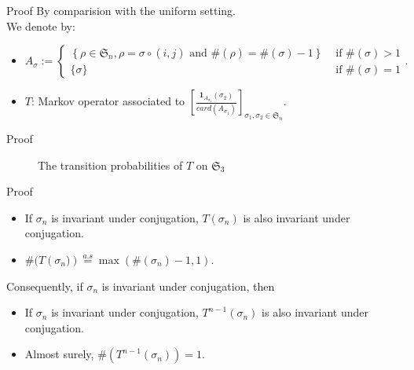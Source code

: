 \documentclass[english,xcolor=table]{beamer}
\begin{document}
\begin{frame}{Proof} 
By comparision with the uniform setting. 
\\ 
We denote by:
\begin{itemize}
    \item $A_\sigma:=
    \begin{cases}
        \left\{\rho\in\mathfrak{S}_n,\rho =\sigma\circ(i,j)  \text{ and }  \#(\rho)=\#(\sigma)-1 \right\} & \text{ if } \#(\sigma)>1
        \\ \{\sigma\} & \text{ if } \#(\sigma)=1
    \end{cases}.
    $
    \item $T$: Markov operator associated to  $\left[\frac{\mathbf{1}_{A_{\sigma_1}}(\sigma_2)}{card(A_{\sigma_1})}\right]_{\sigma_1,\sigma_2\in \mathfrak{S}_n}$.
\end{itemize}

\end{frame}
\begin{frame}{Proof}
\begin{figure}[H]
\centering
{}
    \caption{The transition probabilities of $T$ on $\mathfrak{S}_3$}
    \label{figm}
\end{figure}
\end{frame}
\begin{frame}{Proof}
    \begin{itemize}
        \item If $\sigma_n$ is invariant under conjugation, $T(\sigma_n)$ is also invariant under conjugation.
        \item $
\#(T \left(\sigma_{n})\right)\overset{a.s}{=}\max(\#(\sigma_n)-1,1). $  
    \end{itemize}
    Consequently, if $\sigma_n$ is invariant under conjugation, then 
    \begin{itemize}
        \item If $\sigma_n$ is invariant under conjugation, $T^{n-1}(\sigma_n)$ is also invariant under conjugation.
        \item Almost surely, $\#\left(T^{n-1}(\sigma_n)\right)=1$.
    \end{itemize}
\end{frame}
\end{document}
